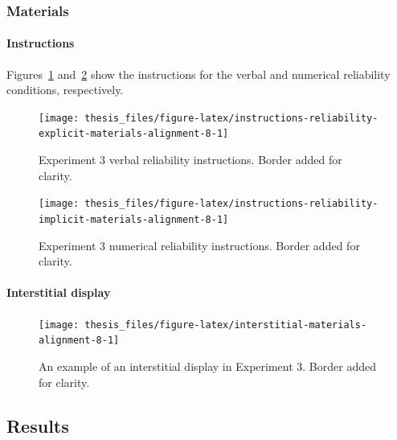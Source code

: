 \documentclass[a4paper, nobind, dvipsnames]{templates/ociamthesis}
\theoremstyle{definition}
\theoremstyle{definition}
\theoremstyle{definition}
\theoremstyle{definition}
\theoremstyle{remark}
\begin{document}
\newpage

\subsubsection{Materials}

\hypertarget{instructions-materials-alignment-8-appendix}{%
\paragraph{Instructions}\label{instructions-materials-alignment-8-appendix}}

Figures~\ref{fig:instructions-reliability-explicit-materials-alignment-8}
and~\ref{fig:instructions-reliability-implicit-materials-alignment-8} show the
instructions for the verbal and numerical reliability conditions, respectively.



\begin{figure}
\texttt{[image: thesis\_files/figure-latex/instructions-reliability-explicit-materials-alignment-8-1]} \caption{Experiment 3 verbal reliability instructions. Border added for clarity.}\label{fig:instructions-reliability-explicit-materials-alignment-8}
\end{figure}



\begin{figure}
\texttt{[image: thesis\_files/figure-latex/instructions-reliability-implicit-materials-alignment-8-1]} \caption{Experiment 3 numerical reliability instructions. Border added for clarity.}\label{fig:instructions-reliability-implicit-materials-alignment-8}
\end{figure}

\hypertarget{interstitial-materials-alignment-8}{%
\paragraph{Interstitial display}\label{interstitial-materials-alignment-8}}



\begin{figure}
\texttt{[image: thesis\_files/figure-latex/interstitial-materials-alignment-8-1]} \caption{An example of an interstitial display in Experiment 3. Border added for clarity.}\label{fig:interstitial-materials-alignment-8}
\end{figure}

\subsection{Results}
\end{document}
